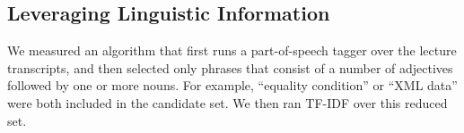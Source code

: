 \subsection{Leveraging Linguistic Information}
\label{sec:useTime}

We measured an
algorithm that first runs a part-of-speech tagger over the lecture
transcripts, and then selected only phrases that consist of a number of adjectives followed by one or more nouns. For
example, ``equality condition'' or ``XML data'' were both included in
the candidate set. We then ran TF-IDF over this reduced set.
